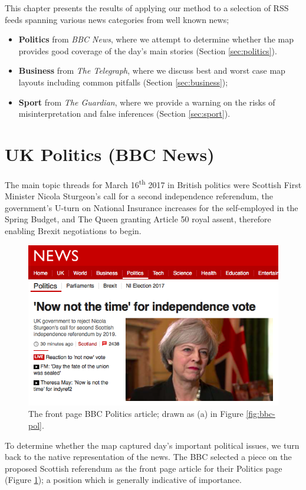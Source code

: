 This chapter presents the results of applying our method to a selection of RSS feeds spanning various news categories from well known news;
\begin{itemize}[noitemsep]
	\item \textbf{Politics} from \textit{BBC News}, where we attempt to determine whether the map provides good coverage of the day's main stories (Section \ref{sec:politics}).
	\item \textbf{Business} from \textit{The Telegraph}, where we discuss best and worst case map layouts including common pitfalls (Section \ref{sec:business});
	\item \textbf{Sport} from \textit{The Guardian}, where we provide a warning on the risks of misinterpretation and false inferences (Section \ref{sec:sport}).
\end{itemize}

\section{UK Politics (BBC News) \label{sec:politics}}

The main topic threads for March 16\textsuperscript{th} 2017 in British politics were Scottish First Minister Nicola Sturgeon's call for a second independence referendum, the government's U-turn on National Insurance increases for the self-employed in the Spring Budget, and The Queen granting Article 50 royal assent, therefore enabling Brexit negotiations to begin.
\begin{figure}[htbp!]
	\centering
	\includegraphics[width=.75\textwidth]{img/results/bbc-politics-frontpage.png}
	\caption{The front page BBC Politics article; drawn as (a) in Figure \ref{fig:bbc-pol}.}
	\label{fig:bbc-pol-home}
\end{figure}

To determine whether the map captured day's important political issues, we turn back to the native representation of the news. The BBC selected a piece on the proposed Scottish referendum as the front page article for their Politics page (Figure \ref{fig:bbc-pol-home}); a position which is generally indicative of importance.

